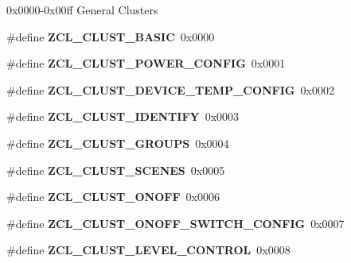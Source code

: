 0x0000-\/0x00ff General Clusters \begin{DoxyCompactItemize}
\item 
\hypertarget{group__zcl_gaf9a529b80905a98850e72bc153789913}{\#define {\bfseries Z\-C\-L\-\_\-\-C\-L\-U\-S\-T\-\_\-\-B\-A\-S\-I\-C}~0x0000}\label{group__zcl_gaf9a529b80905a98850e72bc153789913}

\item 
\hypertarget{group__zcl_ga9a1f2c8d3d83f46e48b63db97ffd1658}{\#define {\bfseries Z\-C\-L\-\_\-\-C\-L\-U\-S\-T\-\_\-\-P\-O\-W\-E\-R\-\_\-\-C\-O\-N\-F\-I\-G}~0x0001}\label{group__zcl_ga9a1f2c8d3d83f46e48b63db97ffd1658}

\item 
\hypertarget{group__zcl_gae28407832bda3643467a6b9e35a9332b}{\#define {\bfseries Z\-C\-L\-\_\-\-C\-L\-U\-S\-T\-\_\-\-D\-E\-V\-I\-C\-E\-\_\-\-T\-E\-M\-P\-\_\-\-C\-O\-N\-F\-I\-G}~0x0002}\label{group__zcl_gae28407832bda3643467a6b9e35a9332b}

\item 
\hypertarget{group__zcl_ga01d2578ad705eff1e1bf19b8affdcbac}{\#define {\bfseries Z\-C\-L\-\_\-\-C\-L\-U\-S\-T\-\_\-\-I\-D\-E\-N\-T\-I\-F\-Y}~0x0003}\label{group__zcl_ga01d2578ad705eff1e1bf19b8affdcbac}

\item 
\hypertarget{group__zcl_gae0f6675dd4154e57413beef821d51392}{\#define {\bfseries Z\-C\-L\-\_\-\-C\-L\-U\-S\-T\-\_\-\-G\-R\-O\-U\-P\-S}~0x0004}\label{group__zcl_gae0f6675dd4154e57413beef821d51392}

\item 
\hypertarget{group__zcl_gae9c2a6f6108cb9317b17dbaa8e1bf52d}{\#define {\bfseries Z\-C\-L\-\_\-\-C\-L\-U\-S\-T\-\_\-\-S\-C\-E\-N\-E\-S}~0x0005}\label{group__zcl_gae9c2a6f6108cb9317b17dbaa8e1bf52d}

\item 
\hypertarget{group__zcl_ga2f39cf2e480d57a36e4345c2e5cd7342}{\#define {\bfseries Z\-C\-L\-\_\-\-C\-L\-U\-S\-T\-\_\-\-O\-N\-O\-F\-F}~0x0006}\label{group__zcl_ga2f39cf2e480d57a36e4345c2e5cd7342}

\item 
\hypertarget{group__zcl_ga0c50bd8024bac316e6c3b5445adbe24e}{\#define {\bfseries Z\-C\-L\-\_\-\-C\-L\-U\-S\-T\-\_\-\-O\-N\-O\-F\-F\-\_\-\-S\-W\-I\-T\-C\-H\-\_\-\-C\-O\-N\-F\-I\-G}~0x0007}\label{group__zcl_ga0c50bd8024bac316e6c3b5445adbe24e}

\item 
\hypertarget{group__zcl_ga08590a00da63decd094dca9eb78e2b8e}{\#define {\bfseries Z\-C\-L\-\_\-\-C\-L\-U\-S\-T\-\_\-\-L\-E\-V\-E\-L\-\_\-\-C\-O\-N\-T\-R\-O\-L}~0x0008}\label{group__zcl_ga08590a00da63decd094dca9eb78e2b8e}


\end{DoxyCompactItemize}
